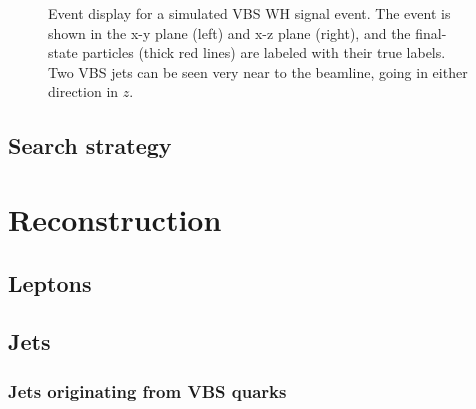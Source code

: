 \begin{figure}[htb]
    \centering
    \qquad
    \caption{
        Event display for a simulated VBS WH signal event. 
        The event is shown in the x-y plane (left) and x-z plane (right), and the final-state particles (thick red lines) are labeled with their true labels. 
        Two VBS jets can be seen very near to the beamline, going in either direction in $z$. 
    }
    \label{fig:vbs_fireworks}
\end{figure}

\subsection{Search strategy}

\section{Reconstruction}
\subsection{Leptons}
\subsection{Jets}
\subsubsection{Jets originating from VBS quarks}
